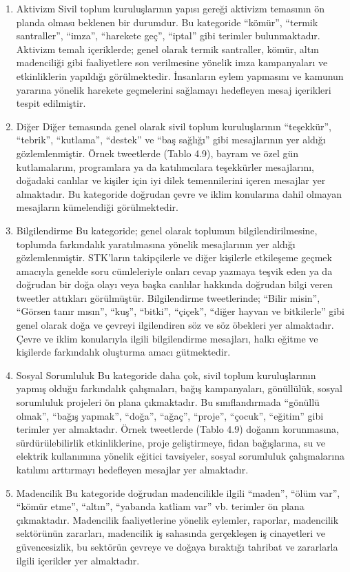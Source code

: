 \documentclass[
]{book}
\begin{document}
\begin{enumerate}
\item
  Aktivizm
  Sivil toplum kuruluşlarının yapısı gereği aktivizm temasının ön planda olması beklenen bir durumdur. Bu kategoride ``kömür'', ``termik santraller'', ``imza'', ``harekete geç'', ``iptal'' gibi terimler bulunmaktadır. Aktivizm temalı içeriklerde; genel olarak termik santraller, kömür, altın madenciliği gibi faaliyetlere son verilmesine yönelik imza kampanyaları ve etkinliklerin yapıldığı görülmektedir. İnsanların eylem yapmasını ve kamunun yararına yönelik harekete geçmelerini sağlamayı hedefleyen mesaj içerikleri tespit edilmiştir.
\item
  Diğer
  Diğer temasında genel olarak sivil toplum kuruluşlarının ``teşekkür'', ``tebrik'', ``kutlama'', ``destek'' ve ``baş sağlığı'' gibi mesajlarının yer aldığı gözlemlenmiştir. Örnek tweetlerde (Tablo 4.9), bayram ve özel gün kutlamalarını, programlara ya da katılımcılara teşekkürler mesajlarını, doğadaki canlılar ve kişiler için iyi dilek temennilerini içeren mesajlar yer almaktadır. Bu kategoride doğrudan çevre ve iklim konularına dahil olmayan mesajların kümelendiği görülmektedir.
\item
  Bilgilendirme
  Bu kategoride; genel olarak toplumun bilgilendirilmesine, toplumda farkındalık yaratılmasına yönelik mesajlarının yer aldığı gözlemlenmiştir. STK'ların takipçilerle ve diğer kişilerle etkileşeme geçmek amacıyla genelde soru cümleleriyle onları cevap yazmaya teşvik eden ya da doğrudan bir doğa olayı veya başka canlılar hakkında doğrudan bilgi veren tweetler attıkları görülmüştür. Bilgilendirme tweetlerinde; ``Bilir misin'', ``Görsen tanır mısın'', ``kuş'', ``bitki'', ``çiçek'', ``diğer hayvan ve bitkilerle'' gibi genel olarak doğa ve çevreyi ilgilendiren söz ve söz öbekleri yer almaktadır. Çevre ve iklim konularıyla ilgili bilgilendirme mesajları, halkı eğitme ve kişilerde farkındalık oluşturma amacı gütmektedir.
\item
  Sosyal Sorumluluk
  Bu kategoride daha çok, sivil toplum kuruluşlarının yapmış olduğu farkındalık çalışmaları, bağış kampanyaları, gönüllülük, sosyal sorumluluk projeleri ön plana çıkmaktadır. Bu sınıflandırmada ``gönüllü olmak'', ``bağış yapmak'', ``doğa'', ``ağaç'', ``proje'', ``çocuk'', ``eğitim'' gibi terimler yer almaktadır. Örnek tweetlerde (Tablo 4.9) doğanın korunmasına, sürdürülebilirlik etkinliklerine, proje geliştirmeye, fidan bağışlarına, su ve elektrik kullanımına yönelik eğitici tavsiyeler, sosyal sorumluluk çalışmalarına katılımı arttırmayı hedefleyen mesajlar yer almaktadır.
\item
  Madencilik
  Bu kategoride doğrudan madencilikle ilgili ``maden'', ``ölüm var'', ``kömür etme'', ``altın'', ``yabanda katliam var'' vb. terimler ön plana çıkmaktadır. Madencilik faaliyetlerine yönelik eylemler, raporlar, madencilik sektörünün zararları, madencilik iş sahasında gerçekleşen iş cinayetleri ve güvencesizlik, bu sektörün çevreye ve doğaya bıraktığı tahribat ve zararlarla ilgili içerikler yer almaktadır.
\end{enumerate}
\end{document}
